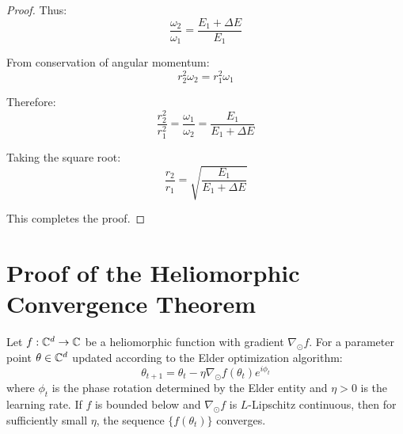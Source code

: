 \begin{proof}
Thus:
\begin{equation}
\frac{\omega_2}{\omega_1} = \frac{E_1 + \Delta E}{E_1}
\end{equation}

From conservation of angular momentum:
\begin{equation}
r_2^2\omega_2 = r_1^2\omega_1
\end{equation}

Therefore:
\begin{equation}
\frac{r_2^2}{r_1^2} = \frac{\omega_1}{\omega_2} = \frac{E_1}{E_1 + \Delta E}
\end{equation}

Taking the square root:
\begin{equation}
\frac{r_2}{r_1} = \sqrt{\frac{E_1}{E_1 + \Delta E}}
\end{equation}

This completes the proof.
\end{proof}

\section{Proof of the Heliomorphic Convergence Theorem}

\begin{theorem}
Let $f: \mathbb{C}^d \to \mathbb{C}$ be a heliomorphic function with gradient $\nabla_{\odot} f$. For a parameter point $\theta \in \mathbb{C}^d$ updated according to the Elder optimization algorithm:
\begin{equation}
\theta_{t+1} = \theta_t - \eta \nabla_{\odot} f(\theta_t) e^{i\phi_t}
\end{equation}
where $\phi_t$ is the phase rotation determined by the Elder entity and $\eta > 0$ is the learning rate. If $f$ is bounded below and $\nabla_{\odot} f$ is $L$-Lipschitz continuous, then for sufficiently small $\eta$, the sequence $\{f(\theta_t)\}$ converges.
\end{theorem}

